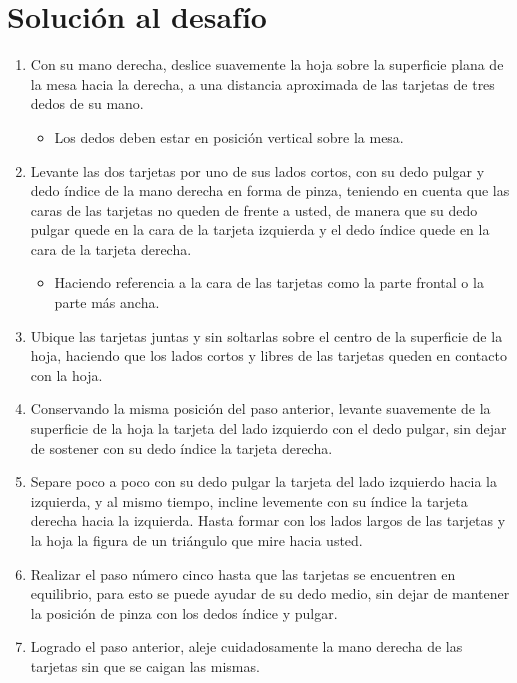 \documentclass{article}
\begin{document}
\section{Solución al desafío}\label{intro}
\begin{enumerate}
\item Con su mano derecha, deslice suavemente la hoja sobre la superficie plana de la mesa hacia la derecha, a una distancia aproximada de las tarjetas de tres dedos de su mano.
\begin{itemize}
\item Los dedos deben estar en posición vertical sobre la mesa.
\end{itemize}
\item Levante las dos tarjetas por uno de sus lados cortos, con su dedo pulgar y dedo índice de la mano derecha en forma de pinza, teniendo en cuenta que las caras de las tarjetas no queden de frente a usted, de manera que su dedo pulgar quede en la cara de la tarjeta izquierda y el dedo índice quede en la cara de la tarjeta derecha.
\begin{itemize}
\item Haciendo referencia a la cara de las tarjetas como la parte frontal o la parte más ancha.
\end{itemize}
\item Ubique las tarjetas juntas y sin soltarlas sobre el centro de la superficie de la hoja, haciendo que los lados cortos y libres de las tarjetas queden en contacto con la hoja.
\item Conservando la misma posición del paso anterior, levante suavemente de la superficie de la hoja la tarjeta del lado izquierdo con el dedo pulgar, sin dejar de sostener con su dedo índice la tarjeta derecha.  
\item Separe poco a poco con su dedo pulgar la tarjeta del lado izquierdo hacia la izquierda, y al mismo tiempo, incline levemente con su índice la tarjeta derecha hacia la izquierda. Hasta formar con los lados largos de las tarjetas y la hoja la figura de un triángulo que mire hacia usted.
\item Realizar el paso número cinco hasta que las tarjetas se encuentren en equilibrio, para esto se puede ayudar de su dedo medio, sin dejar de mantener la posición de pinza con los dedos índice y pulgar.
\item Logrado el paso anterior, aleje cuidadosamente la mano derecha de las tarjetas sin que se caigan las mismas.
\end {enumerate}
\end{document}
